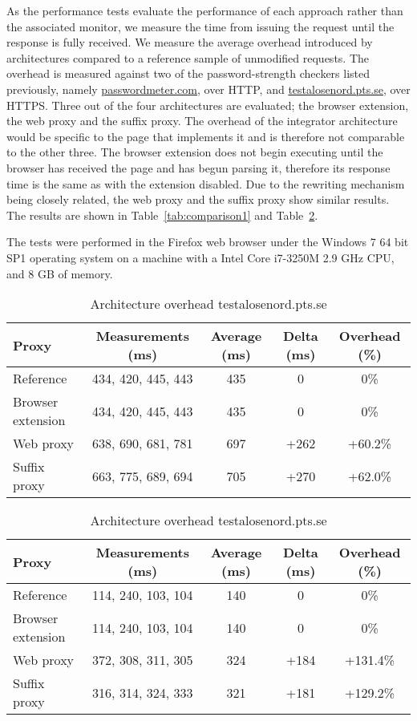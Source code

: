 \documentclass{llncs}
\begin{document}
As the performance tests evaluate the performance of each approach rather than the associated monitor, we measure
the time from issuing the request until the response is fully received. 
We measure the average overhead introduced by architectures compared to a reference sample of unmodified requests. 
The overhead is measured against two of the password-strength checkers listed 
previously, namely \url{passwordmeter.com}, over HTTP, and \url{testalosenord.pts.se}, 
over HTTPS. 
Three out of the four architectures are evaluated; the browser extension, the web proxy and the suffix proxy. 
The overhead of the integrator architecture would be specific to the 
page that implements it and is therefore not comparable to the other three.
The browser extension does not begin executing until the browser has received the page and has begun parsing it, therefore 
its response time is the same as with the extension disabled. 
Due to the rewriting mechanism being closely related, the web proxy and the suffix proxy show similar results. 
The results are shown in Table~\ref{tab:comparison1} and Table~\ref{tab:comparison2}. 

The tests were performed in the Firefox web browser under the Windows 7 64 bit SP1 operating system on a machine with a Intel Core i7-3250M 2.9 GHz CPU, and 8 GB of memory.



\begin{table}[h!]
\center
\begin{tabular}{l|c|c|c|c}
Proxy & Measurements (ms) & Average (ms) & Delta (ms) & Overhead (\%) \\ \hline
Reference & 434, 420, 445, 443 & 435 & 0 & 0\% \\ \hline
Browser extension & 434, 420, 445, 443 & 435 & 0 & 0\% \\ \hline
Web proxy & 638, 690, 681, 781 & 697 & +262 & +60.2\% \\ \hline
Suffix proxy & 663, 775, 689, 694 & 705 & +270 & +62.0\% \\ \hline
\end{tabular}
\caption{Architecture overhead www.passwordmeter.com}
\label{tab:comparison1}
\begin{tabular}{l|c|c|c|c}
Proxy & Measurements (ms) & Average (ms) & Delta (ms) & Overhead (\%) \\ \hline
Reference & 114, 240, 103, 104 & 140 & 0 & 0\% \\ \hline
Browser extension & 114, 240, 103, 104 & 140 & 0 & 0\% \\ \hline
Web proxy & 372, 308, 311, 305 & 324 & +184 & +131.4\% \\ \hline
Suffix proxy & 316, 314, 324, 333 & 321 & +181 & +129.2\% \\ \hline
\end{tabular}
\caption{Architecture overhead testalosenord.pts.se}
\label{tab:comparison2}
\end{table}
\end{document}
